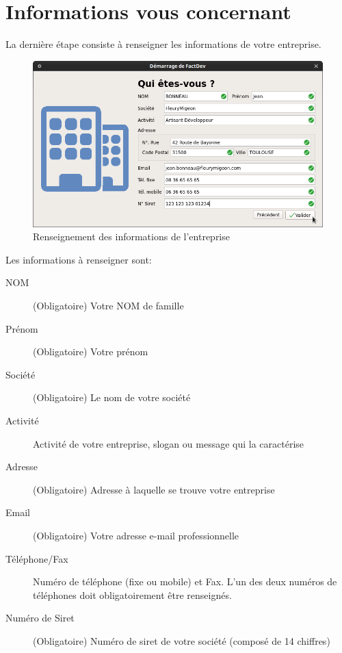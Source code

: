 \section{Informations vous concernant}
La derni\`ere \'etape consiste \`a renseigner les informations de votre entreprise. 
\begin{figure}[H]
	\centering
	\includegraphics[width=12cm]{screens/lancement3.png}
	\caption{Renseignement des informations de l'entreprise}
	\label{fig:renseignementInformationsEntreprise}
\end{figure}
Les informations \`a renseigner sont:
\begin{description}
	\item[NOM] (Obligatoire) Votre NOM de famille
	\item[Pr\'enom] (Obligatoire) Votre pr\'enom
	\item[Soci\'et\'e] (Obligatoire) Le nom de votre soci\'et\'e
	\item[Activit\'e] Activit\'e de votre entreprise, slogan ou message qui la caract\'erise
	\item[Adresse] (Obligatoire) Adresse \`a laquelle se trouve votre entreprise
	\item[Email] (Obligatoire) Votre adresse e-mail professionnelle
	\item[T\'el\'ephone/Fax] Num\'ero de t\'el\'ephone (fixe ou mobile) et Fax. L'un des deux num\'eros de t\'el\'ephones doit obligatoirement \^etre renseign\'es. 
	\item[Num\'ero de Siret] (Obligatoire) Num\'ero de siret de votre soci\'et\'e (compos\'e de 14 chiffres)
\end{description} 


















